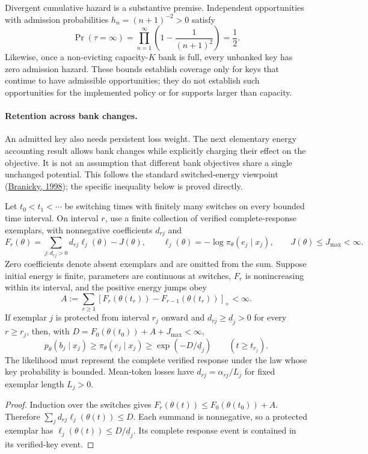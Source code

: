 Divergent cumulative hazard is a substantive premise. Independent
opportunities with admission probabilities $h_n=(n+1)^{-2}>0$ satisfy
\[
 \Pr(\tau=\infty)=\prod_{n=1}^\infty
 \left(1-\frac1{(n+1)^2}\right)=\frac12.
\]
Likewise, once a non-evicting capacity-$K$ bank is full, every unbanked key has
zero admission hazard. These bounds establish coverage only for keys that
continue to have admissible opportunities; they do not establish such
opportunities for the implemented policy or for supports larger than capacity.

\paragraph{Retention across bank changes.}
An admitted key also needs persistent loss weight. The next elementary energy
accounting result allows bank changes while explicitly charging their effect
on the objective. It is not an assumption that different bank objectives
share a single unchanged potential. This follows the standard switched-energy
viewpoint (\href{https://people.ece.ubc.ca/moishi/eece571m/articles/Branicky98.pdf}{Branicky, 1998});
the specific inequality below is proved directly.

\begin{proposition}
Let $t_0<t_1<\cdots$ be switching times with finitely many switches on every
bounded time interval. On interval $r$, use a finite collection of verified
complete-response exemplars, with nonnegative coefficients $d_{rj}$ and
\[
 F_r(\theta)=\sum_{j:d_{rj}>0}d_{rj}\ell_j(\theta)-J(\theta),
 \qquad \ell_j(\theta)=-\log\pi_\theta(e_j\mid x_j),
 \qquad J(\theta)\le J_{\max}<\infty.
\]
Zero coefficients denote absent exemplars and are omitted from the sum.
Suppose initial energy is finite, parameters are continuous
at switches, $F_r$ is nonincreasing within its interval, and the positive
energy jumps obey
\[
 A:=\sum_{r\ge1}
 \left[F_r(\theta(t_r))-F_{r-1}(\theta(t_r))\right]_+<\infty.
\]
If exemplar $j$ is protected from interval $r_j$ onward and
$d_{rj}\ge\underline d_j>0$ for every $r\ge r_j$, then, with
$D=F_0(\theta(t_0))+A+J_{\max}<\infty$,
\[
 p_\theta(b_j\mid x_j)\ge\pi_\theta(e_j\mid x_j)
 \ge\exp(-D/\underline d_j)
 \qquad(t\ge t_{r_j}).
\]
The likelihood must represent the complete verified response under the law
whose key probability is bounded. Mean-token losses have
$d_{rj}=\alpha_{rj}/L_j$ for fixed exemplar length $L_j>0$.
\end{proposition}
\begin{proof}
Induction over the switches gives
$F_r(\theta(t))\le F_0(\theta(t_0))+A$. Therefore
$\sum_jd_{rj}\ell_j(\theta(t))\le D$.
Each summand is nonnegative, so a protected exemplar has
$\ell_j(\theta(t))\le D/\underline d_j$.
Its complete response event is contained in its verified-key event.
\end{proof}

